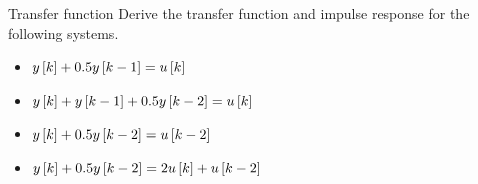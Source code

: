\documentclass[aspectratio=169]{beamer}
\def\ls{\ensuremath\left[}
\def\rs{\ensuremath\right]}
\begin{document}
\begin{frame}[t]{Transfer function}
Derive the transfer function and impulse response for the following systems.
\begin{itemize}
    \item $y\ls k\rs + 0.5y\ls k - 1\rs = u\ls k\rs$
    \item $y\ls k\rs + y\ls k - 1\rs + 0.5y\ls k - 2\rs = u\ls k\rs$
    \item $y\ls k\rs + 0.5y\ls k - 2\rs = u\ls k - 2\rs$
    \item $y\ls k\rs + 0.5y\ls k - 2\rs = 2u\ls k\rs + u\ls k - 2\rs$
\end{itemize}
\end{frame}
\end{document}
